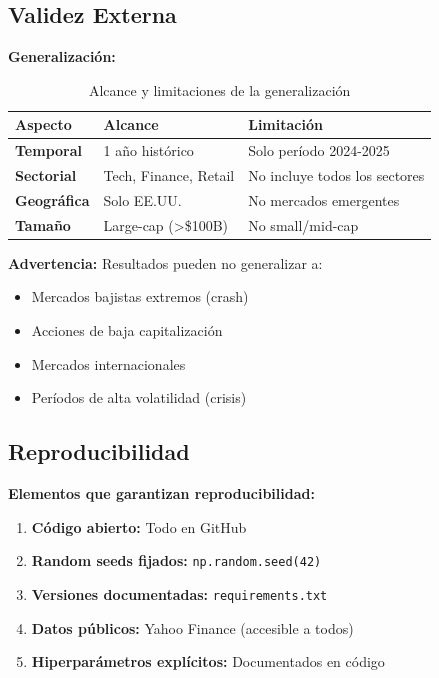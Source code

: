 \documentclass[12pt,a4paper]{article}
\begin{document}
\subsection{Validez Externa}

\textbf{Generalización:}

\begin{table}[h!]
\centering
\begin{tabular}{lll}
\toprule
\textbf{Aspecto} & \textbf{Alcance} & \textbf{Limitación} \\
\midrule
\textbf{Temporal} & 1 año histórico & Solo período 2024-2025 \\
\textbf{Sectorial} & Tech, Finance, Retail & No incluye todos los sectores \\
\textbf{Geográfica} & Solo EE.UU. & No mercados emergentes \\
\textbf{Tamaño} & Large-cap (>\$100B) & No small/mid-cap \\
\bottomrule
\end{tabular}
\caption{Alcance y limitaciones de la generalización}
\end{table}

\textbf{Advertencia:} Resultados pueden no generalizar a:
\begin{itemize}
    \item Mercados bajistas extremos (crash)
    \item Acciones de baja capitalización
    \item Mercados internacionales
    \item Períodos de alta volatilidad (crisis)
\end{itemize}

\subsection{Reproducibilidad}

\textbf{Elementos que garantizan reproducibilidad:}

\begin{enumerate}
    \item \textbf{Código abierto:} Todo en GitHub
    \item \textbf{Random seeds fijados:} \texttt{np.random.seed(42)}
    \item \textbf{Versiones documentadas:} \texttt{requirements.txt}
    \item \textbf{Datos públicos:} Yahoo Finance (accesible a todos)
    \item \textbf{Hiperparámetros explícitos:} Documentados en código
\end{enumerate}
\end{document}
